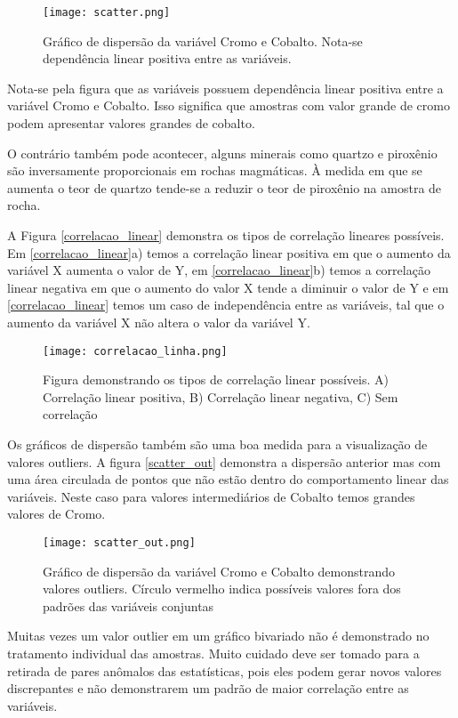 \begin{figure}[H]
  	\centering
  	\texttt{[image: scatter.png]}	
  	\caption{Gráfico de dispersão da variável Cromo e Cobalto. Nota-se dependência linear positiva entre as variáveis. }
  	\label{scatter}
\end{figure} 
   
Nota-se pela figura que as variáveis possuem dependência linear positiva entre a variável Cromo e Cobalto. Isso significa que amostras com valor grande de cromo podem apresentar valores grandes de cobalto. 

O contrário também pode acontecer, alguns minerais como quartzo e piroxênio são inversamente proporcionais em rochas magmáticas. À medida em que se aumenta o teor de quartzo tende-se a reduzir o teor de piroxênio na amostra de rocha. 

A Figura \eqref{correlacao_linear} demonstra os tipos de correlação lineares possíveis. Em \eqref{correlacao_linear}a) temos a correlação linear positiva em que o aumento da variável X aumenta o valor de Y, em \eqref{correlacao_linear}b) temos a correlação linear negativa em que o aumento do valor X tende a diminuir o valor de Y e em \eqref{correlacao_linear} temos um caso de independência entre as variáveis, tal que o aumento da variável X não altera o valor da variável Y. 

\begin{figure}[H]
	\centering
	\texttt{[image: correlacao\_linha.png]}	
	\caption{Figura demonstrando os tipos de correlação linear possíveis. A) Correlação linear positiva, B) Correlação linear negativa, C) Sem correlação }
	\label{correlacao_linear}
\end{figure}

   
Os gráficos de dispersão também são uma boa medida para a visualização de valores outliers. A figura \eqref{scatter_out} demonstra a dispersão anterior mas com uma área circulada de pontos que não estão dentro do comportamento linear das variáveis. Neste caso para valores intermediários de Cobalto temos grandes valores de Cromo.

 \begin{figure}[H]
 	\centering
 	\texttt{[image: scatter\_out.png]}	
 	\caption{Gráfico de dispersão da variável Cromo e Cobalto demonstrando valores outliers. Círculo vermelho indica possíveis valores fora dos padrões das variáveis conjuntas }
 	\label{scatter_out}
 \end{figure} 
 
 Muitas vezes um valor outlier em um gráfico bivariado não é demonstrado no tratamento individual das amostras. Muito cuidado deve ser tomado para a retirada de pares anômalos das estatísticas, pois eles podem gerar novos valores discrepantes e não demonstrarem um padrão de maior correlação entre as variáveis.
 
